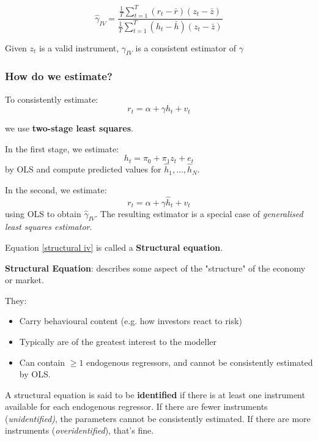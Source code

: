 \documentclass[11pt]{article}
\begin{document}
\begin{equation}
\widehat{\gamma}_{I V}=\frac{\frac{1}{T} \sum_{t=1}^T\left(r_t-\bar{r}\right)\left(z_t-\bar{z}\right)}{\frac{1}{T} \sum_{t=1}^T\left(h_t-\bar{h}\right)\left(z_t-\bar{z}\right)}
\end{equation}

Given $z_t$ is a valid instrument, $\gamma_{IV}$ is a consistent estimator of $\gamma$

\subsubsection{How do we estimate?}

\begin{procedure}
To consistently estimate:
\begin{equation}
    \label{structural iv}
    r_t =\alpha + \gamma h_t + v_t
\end{equation}

we use \textbf{two-stage least squares}.

In the first stage, we estimate:
\begin{equation}
    \label{iv first stage}
    h_t = \pi_0 + \pi_1 z_t + e_t
\end{equation}
by OLS and compute predicted values for $\hat{h}_1, \ldots, \hat{h}_N$. 

In the second, we estimate:
\begin{equation}
    \label{iv second stage}
    r_t = \alpha + \gamma \hat{h}_t + v_t
\end{equation}
using OLS to obtain $\hat{\gamma}_{IV}$. The resulting estimator is a special case of \textit{generalised least squares estimator}.
\end{procedure}

Equation \eqref{structural iv} is called a \textbf{Structural equation}. 
\begin{definition}
\textbf{Structural Equation}: describes some aspect of the "structure" of the economy or market.

They:
\begin{itemize}
    \item  Carry behavioural content (e.g. how investors react to risk)
    \item Typically are of the greatest interest to the modeller
    \item Can contain $\geq 1$ endogenous regressors, and cannot be consistently estimated by OLS.
\end{itemize}

A structural equation is said to be \textbf{identified} if there is at least one instrument available for each endogenous regressor. If there are fewer instruments (\textit{unidentified)}, the parameters cannot be consistently estimated. If there are more instruments (\textit{overidentified}), that's fine.
\end{definition}
\end{document}
